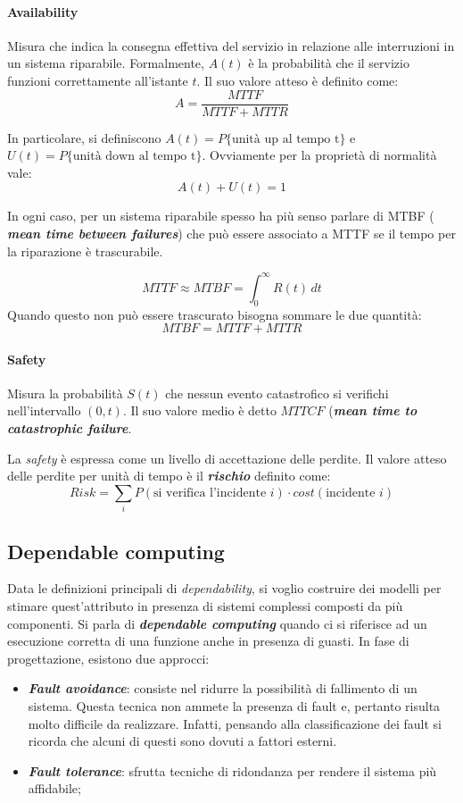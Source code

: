 \documentclass{article}
\begin{document}
\paragraph{Availability} Misura che indica la consegna effettiva del servizio in relazione
alle interruzioni in un sistema riparabile. Formalmente, $A(t)$ è la probabilità che il 
servizio funzioni correttamente all'istante $t$. Il suo valore atteso è definito come:
\[
  A = \frac{MTTF}{MTTF + MTTR}
\]

In particolare, si definiscono $A(t) = P\{\text{unità up al tempo t}\}$ e $U(t) = P\{
  \text{unità down al tempo t}\}$. Ovviamente per la proprietà di normalità vale:
\[
  A(t) + U(t) = 1
\]

In ogni caso, per un sistema riparabile spesso ha più senso parlare di MTBF (
\textbf{\textit{mean time between failures}}) che può essere associato a MTTF se il tempo 
per la riparazione è trascurabile. 

\[
  MTTF \approx MTBF = \int_0^\infty R(t)\, dt
\]
Quando questo non può essere trascurato bisogna sommare le due quantità:
\[
  MTBF = MTTF + MTTR
\]

\paragraph{Safety} Misura la probabilità $S(t)$ che nessun evento catastrofico si verifichi
nell'intervallo $(0,t)$. Il suo valore medio è detto $MTTCF$ (\textbf{\textit{mean time to 
catastrophic failure}}. 

La \textit{safety} è espressa come un livello di accettazione delle perdite. Il valore 
atteso delle perdite per unità di tempo è il \textbf{\textit{rischio}} definito come:
\begin{equation*}
  Risk = \sum_i P(\text{si verifica l'incidente $i$}) \cdot cost(\text{incidente $i$})
\end{equation*}

\subsection{Dependable computing}
Data le definizioni principali di \textit{dependability}, si voglio costruire dei modelli
per stimare quest'attributo in presenza di sistemi complessi composti da più componenti. 
Si parla di \textbf{\textit{dependable computing}} quando ci si riferisce ad un esecuzione 
corretta di una funzione anche in presenza di guasti. In fase di progettazione, esistono
due approcci:
\begin{itemize}
  \item \textbf{\textit{Fault avoidance}}: consiste nel ridurre la 
    possibilità di fallimento di un sistema. Questa tecnica non ammete la presenza di fault e,
    pertanto risulta molto difficile da realizzare. Infatti, pensando alla classificazione
    dei fault si ricorda che alcuni di questi sono dovuti a fattori esterni.
  \item \textbf{\textit{Fault tolerance}}: sfrutta tecniche di ridondanza per rendere il 
    sistema più affidabile;
\end{itemize}
\end{document}

